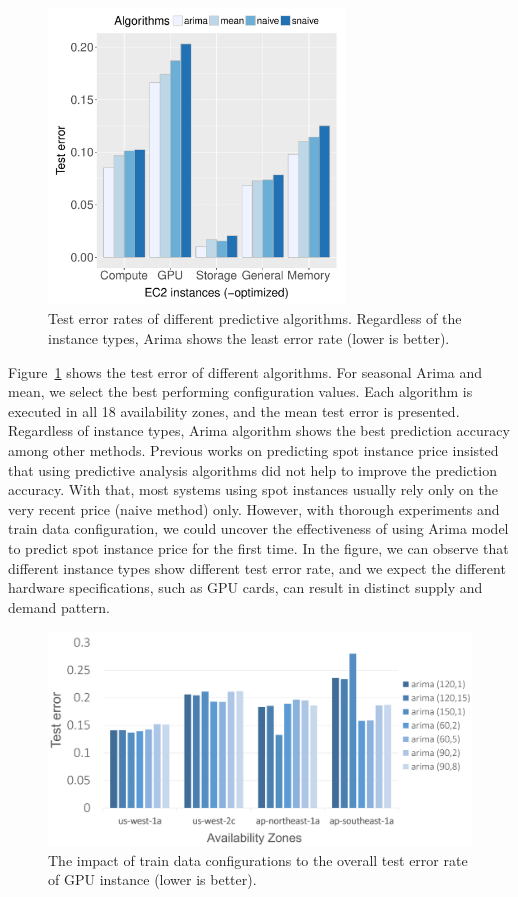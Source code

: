 \documentclass[graybox]{svmult}
\begin{document}
\begin{figure}
  \centering\includegraphics[width=0.7\textwidth]{figures/algorithm-compare-different-instance-type.pdf}\caption{Test error rates of different predictive algorithms. Regardless of the instance types, Arima shows the least error rate (lower is better).\label{fig:algo-diff-inst}}
\end{figure}

Figure~\ref{fig:algo-diff-inst} shows the test error of different algorithms. For seasonal Arima and mean, we select the best performing configuration values. Each algorithm is executed in all 18 availability zones, and the mean test error is presented. Regardless of instance types, Arima algorithm shows the best prediction accuracy among other methods. Previous works on predicting spot instance price insisted that using predictive analysis algorithms did not help to improve the prediction accuracy. With that, most systems using spot instances usually rely only on the very recent price (naive method) only. However, with thorough experiments and train data configuration, we could uncover the effectiveness of using Arima model to predict spot instance price for the first time. In the figure, we can observe that different instance types show different test error rate, and we expect the different hardware specifications, such as GPU cards, can result in distinct supply and demand pattern.  

\begin{figure}
  \centering\includegraphics[width=1.0\textwidth]{figures/g2-4m-l.png}\caption{The impact of train data configurations to the overall test error rate of GPU instance (lower is better).\label{fig:g2-param-diverse}}
\end{figure}
\end{document}
